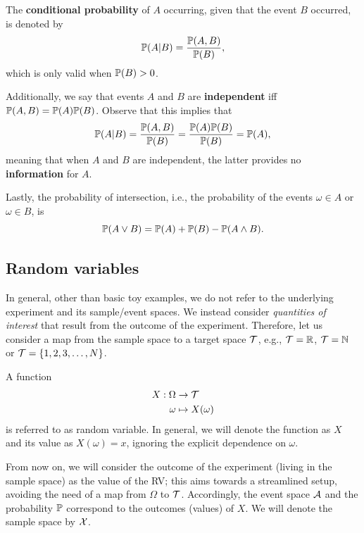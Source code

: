 The \textbf{conditional probability} of $A$ occurring, given that the event $B$ occurred, is denoted by 
\begin{equation}
	\mathbb{P}(A|B) = \frac{\mathbb{P}(A,B)}{\mathbb{P}(B)},
\end{equation}
which is only valid when $\mathbb{P}(B)>0$.

Additionally, we say that events $A$ and $B$ are \textbf{independent} iff $\mathbb{P}(A,B)=\mathbb{P}(A)\mathbb{P}(B)$. Observe that this implies that 
\begin{equation}
	\mathbb{P}(A|B) = \frac{\mathbb{P}(A,B)}{\mathbb{P}(B)}= \frac{\mathbb{P}(A)\mathbb{P}(B)}{\mathbb{P}(B)} = \mathbb{P}(A),
\end{equation}
meaning that when $A$ and $B$ are independent, the latter provides no \textbf{information} for $A$.

Lastly, the probability of intersection, i.e., the probability of the events $\omega\in A$ or $\omega\in B$, is
\begin{equation}
	\mathbb{P}(A \vee B) = \mathbb{P}(A) + \mathbb{P}(B) - \mathbb{P}(A \wedge B).
\end{equation}

\subsection{Random variables}
\label{cap:prob_RV}

In general, other than basic toy examples, we do not refer to the underlying experiment and its sample/event spaces. We instead consider \emph{quantities of interest} that result from the outcome of the experiment. Therefore, let us consider a map from the sample space to a target space ${\mathcal T}$, e.g., ${\mathcal T}=\mathbb{R}$, ${\mathcal T}={\mathbb N}$ or ${\mathcal T}=\{1,2,3,\ldots,N\}$.


\begin{definition} A function 
\begin{align}
 	X: \Omega &\to {\mathcal T}\\
 	\omega &\mapsto X(\omega)
 \end{align} 
is referred to as random variable. In general, we will denote the function as $X$ and its value as $X(\omega) = x$, ignoring the explicit dependence on $\omega$.
\end{definition}

\begin{remark}
From now on, we will consider the outcome of the experiment (living in the sample space) as the value of the RV; this aims towards a streamlined setup, avoiding the need of a map from $\Omega$ to ${\mathcal T}$. Accordingly, the event space ${\mathcal A}$ and the probability $\mathbb{P}$ correspond to the outcomes (values) of $X$. We will denote the sample space by ${\mathcal X}$. 
\end{remark}

